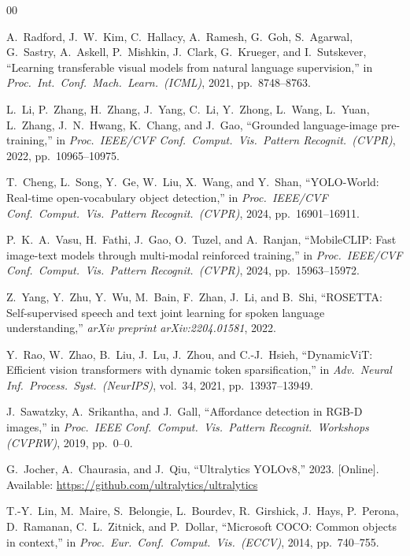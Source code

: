 \documentclass[conference]{IEEEtran}
\begin{document}
\begin{thebibliography}{00}

A.\ Radford, J.\ W.\ Kim, C.\ Hallacy, A.\ Ramesh, G.\ Goh, S.\ Agarwal,
G.\ Sastry, A.\ Askell, P.\ Mishkin, J.\ Clark, G.\ Krueger, and I.\ Sutskever,
``Learning transferable visual models from natural language supervision,''
in \emph{Proc.\ Int.\ Conf.\ Mach.\ Learn.\ (ICML)}, 2021, pp.\ 8748--8763.

L.\ Li, P.\ Zhang, H.\ Zhang, J.\ Yang, C.\ Li, Y.\ Zhong, L.\ Wang, L.\ Yuan,
L.\ Zhang, J.\ N.\ Hwang, K.\ Chang, and J.\ Gao,
``Grounded language-image pre-training,''
in \emph{Proc.\ IEEE/CVF Conf.\ Comput.\ Vis.\ Pattern Recognit.\ (CVPR)},
2022, pp.\ 10965--10975.

T.\ Cheng, L.\ Song, Y.\ Ge, W.\ Liu, X.\ Wang, and Y.\ Shan,
``YOLO-World: Real-time open-vocabulary object detection,''
in \emph{Proc.\ IEEE/CVF Conf.\ Comput.\ Vis.\ Pattern Recognit.\ (CVPR)},
2024, pp.\ 16901--16911.

P.\ K.\ A.\ Vasu, H.\ Fathi, J.\ Gao, O.\ Tuzel, and A.\ Ranjan,
``MobileCLIP: Fast image-text models through multi-modal reinforced training,''
in \emph{Proc.\ IEEE/CVF Conf.\ Comput.\ Vis.\ Pattern Recognit.\ (CVPR)},
2024, pp.\ 15963--15972.

Z.\ Yang, Y.\ Zhu, Y.\ Wu, M.\ Bain, F.\ Zhan, J.\ Li, and B.\ Shi,
``ROSETTA: Self-supervised speech and text joint learning for spoken language
understanding,'' \emph{arXiv preprint arXiv:2204.01581}, 2022.

Y.\ Rao, W.\ Zhao, B.\ Liu, J.\ Lu, J.\ Zhou, and C.-J.\ Hsieh,
``DynamicViT: Efficient vision transformers with dynamic token sparsification,''
in \emph{Adv.\ Neural Inf.\ Process.\ Syst.\ (NeurIPS)}, vol.\ 34, 2021,
pp.\ 13937--13949.

J.\ Sawatzky, A.\ Srikantha, and J.\ Gall,
``Affordance detection in RGB-D images,''
in \emph{Proc.\ IEEE Conf.\ Comput.\ Vis.\ Pattern Recognit.\ Workshops
(CVPRW)}, 2019, pp.\ 0--0.

G.\ Jocher, A.\ Chaurasia, and J.\ Qiu,
``Ultralytics YOLOv8,'' 2023. [Online].
Available: \url{https://github.com/ultralytics/ultralytics}

T.-Y.\ Lin, M.\ Maire, S.\ Belongie, L.\ Bourdev, R.\ Girshick, J.\ Hays,
P.\ Perona, D.\ Ramanan, C.\ L.\ Zitnick, and P.\ Dollar,
``Microsoft COCO: Common objects in context,''
in \emph{Proc.\ Eur.\ Conf.\ Comput.\ Vis.\ (ECCV)}, 2014, pp.\ 740--755.

\end{thebibliography}
\end{document}
